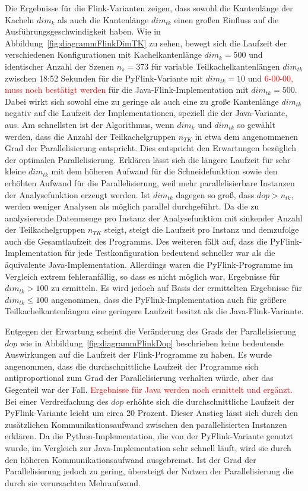 Die Ergebnisse für die Flink-Varianten zeigen, dass sowohl die Kantenlänge der Kacheln $dim_{k}$ als auch die Kantenlänge $dim_{tk}$ einen großen Einfluss auf die Ausführungsgeschwindigkeit haben. Wie in Abbildung~\ref{fig:diagrammFlinkDimTK} zu sehen, bewegt sich die Laufzeit der verschiedenen Konfigurationen mit Kachelkantenlänge $dim_k = 500$ und identischer Anzahl der Szenen $n_s = 373$ für variable Teilkachelkantenlängen $dim_{tk}$ zwischen 18:52 Sekunden für die PyFlink-Variante mit $dim_{tk} = 10$ und \textcolor{red}{6-00-00, muss noch bestätigt werden} für die Java-Flink-Implementation mit $dim_{tk} = 500$. Dabei wirkt sich sowohl eine zu geringe als auch eine zu große Kantenlänge $dim_{tk}$ negativ auf die Laufzeit der Implementationen, speziell die der Java-Variante, aus. Am schnellsten ist der Algorithmus, wenn $dim_k$ und $dim_{tk}$ so gewählt werden, dass die Anzahl der Teilkachelgruppen $n_{TK}$ in etwa dem angenommenen Grad der Parallelisierung entspricht. Dies entspricht den Erwartungen bezüglich der optimalen Parallelisierung.
Erklären lässt sich die längere Laufzeit für sehr kleine $dim_{tk}$ mit dem höheren Aufwand für die Schneidefunktion sowie den erhöhten Aufwand für die Parallelisierung, weil mehr parallelisierbare Instanzen der Analysefunktion erzeugt werden. Ist $dim_{tk}$ dagegen so groß, dass $dop > n_{tk}$, werden weniger Analysen als möglich parallel durchgeführt. Da die zu analysierende Datenmenge pro Instanz der Analysefunktion mit sinkender Anzahl der Teilkachelgruppen $n_{TK}$ steigt, steigt die Laufzeit pro Instanz und demzufolge auch die Gesamtlaufzeit des Programms. Des weiteren fällt auf, dass die PyFlink-Implementation für jede Testkonfiguration bedeutend schneller war als die äquivalente Java-Implementation. Allerdings waren die PyFlink-Programme im Vergleich extrem fehleranfällig, so dass es nicht möglich war, Ergebnisse für $dim_{tk} > 100$ zu ermitteln. Es wird jedoch auf Basis der ermittelten Ergebnisse für $dim_{tk} \leq 100$ angenommen, dass die PyFlink-Implementation auch für größere Teilkachelkantenlängen eine geringere Laufzeit besitzt als die Java-Flink-Variante.

Entgegen der Erwartung scheint die Veränderung des Grads der Parallelisierung $dop$ wie in Abbildung~\ref{fig:diagrammFlinkDop} beschrieben keine bedeutende Auswirkungen auf die Laufzeit der Flink-Programme zu haben. Es wurde angenommen, dass die durchschnittliche Laufzeit der Programme sich antiproportional zum Grad der Parallelisierung verhalten würde, aber das Gegenteil war der Fall. \textcolor{red}{Ergebnisse für Java werden noch ermittelt und ergänzt.} Bei einer Verdreifachung des $dop$ erhöhte sich die durchschnittliche Laufzeit der PyFlink-Variante leicht um circa 20 Prozent. Dieser Anstieg lässt sich durch den zusätzlichen Kommunikationsaufwand zwischen den parallelisierten Instanzen erklären. Da die Python-Implementation, die von der PyFlink-Variante genutzt wurde, im Vergleich zur Java-Implementation sehr schnell läuft, wird sie durch den höheren Kommunikationsaufwand ausgebremst. Ist der Grad der Parallelisierung jedoch zu gering, übersteigt der Nutzen der Parallelisierung die durch sie verursachten Mehraufwand.

